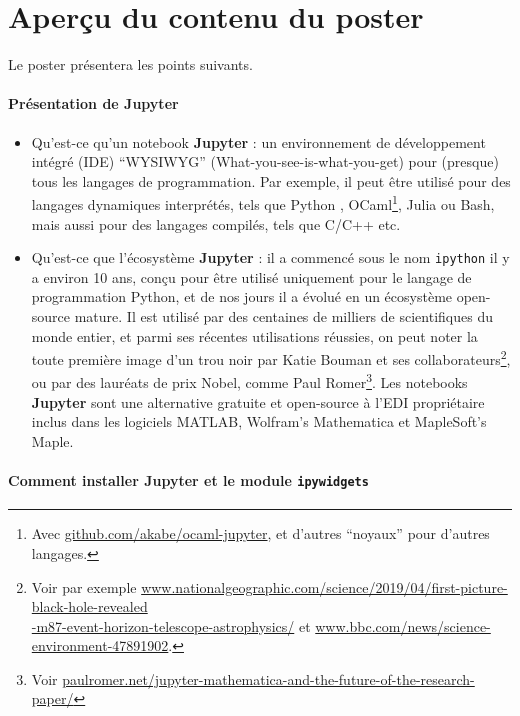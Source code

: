 \documentclass[runningheads]{llncs}
\newcommand{\Jupyter}{\textbf{Jupyter}}
\begin{document}
\section*{Aperçu du contenu du poster}

Le poster présentera les points suivants.

\paragraph{Présentation de \Jupyter}

\begin{itemize}
    \item Qu'est-ce qu'un notebook \Jupyter{} : un environnement de développement intégré (IDE) ``WYSIWYG'' (What-you-see-is-what-you-get) pour (presque) tous les langages de programmation. Par exemple, il peut être utilisé pour des langages dynamiques interprétés, tels que Python \cite{python}, OCaml\footnote{Avec \url{github.com/akabe/ocaml-jupyter}, et d'autres ``noyaux'' pour d'autres langages.}, Julia ou Bash, mais aussi pour des langages compilés, tels que C/C++ etc.

    \item Qu'est-ce que l'écosystème \Jupyter{} : il a commencé sous le nom \texttt{ipython} \cite{ipython} il y a environ 10 ans, conçu pour être utilisé uniquement pour le langage de programmation Python, et de nos jours il a évolué en un écosystème open-source mature.
    Il est utilisé par des centaines de milliers de scientifiques du monde entier, et parmi ses récentes utilisations réussies, on peut noter la toute première image d'un trou noir par Katie Bouman et ses collaborateurs\footnote{Voir par exemple \url{www.nationalgeographic.com/science/2019/04/first-picture-black-hole-revealed}\\\url{-m87-event-horizon-telescope-astrophysics/} et \url{www.bbc.com/news/science-environment-47891902}.}, ou par des lauréats de prix Nobel, comme Paul Romer\footnote{Voir \url{paulromer.net/jupyter-mathematica-and-the-future-of-the-research-paper/}}.
    Les notebooks \Jupyter{} sont une alternative gratuite et open-source à l'EDI propriétaire inclus dans les logiciels MATLAB, Wolfram's Mathematica et MapleSoft's Maple.
\end{itemize}


\paragraph{Comment installer \Jupyter{} et le module \texttt{ipywidgets}}
\end{document}
